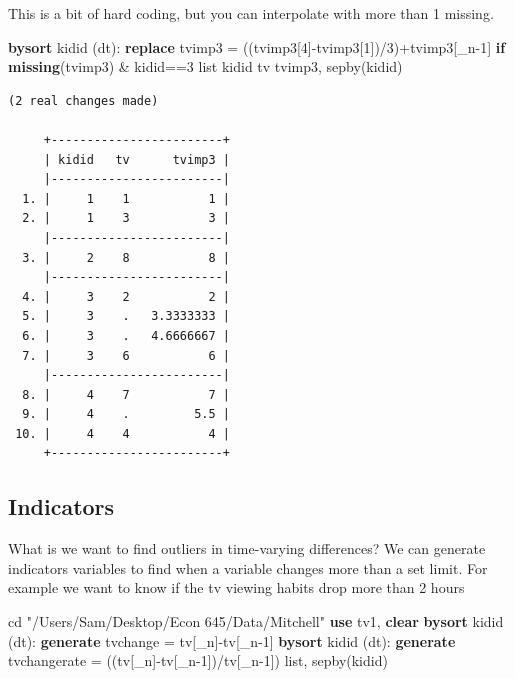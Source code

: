 \documentclass[
]{book}
\newenvironment{Shaded}{\begin{snugshade}}{\end{snugshade}}
\newcommand{\DataTypeTok}[1]{\textcolor[rgb]{0.13,0.29,0.53}{#1}}
\newcommand{\FunctionTok}[1]{\textcolor[rgb]{0.13,0.29,0.53}{\textbf{#1}}}
\newcommand{\KeywordTok}[1]{\textcolor[rgb]{0.13,0.29,0.53}{\textbf{#1}}}
\newcommand{\NormalTok}[1]{#1}
\newcommand{\OtherTok}[1]{\textcolor[rgb]{0.56,0.35,0.01}{#1}}
\newcommand{\StringTok}[1]{\textcolor[rgb]{0.31,0.60,0.02}{#1}}
\begin{document}
This is a bit of hard coding, but you can interpolate with more than 1 missing.

\begin{Shaded}
\begin{Highlighting}[]
\KeywordTok{bysort}\NormalTok{ kidid (dt): }\KeywordTok{replace}\NormalTok{ tvimp3 = ((tvimp3[4]{-}tvimp3[1])/3)+tvimp3[}\DataTypeTok{\_n}\NormalTok{{-}1] }\KeywordTok{if} \FunctionTok{missing}\NormalTok{(tvimp3) \& kidid==3}
\OtherTok{list}\NormalTok{ kidid tv tvimp3, sepby(kidid)}
\end{Highlighting}
\end{Shaded}

\begin{verbatim}
(2 real changes made)

     +------------------------+
     | kidid   tv      tvimp3 |
     |------------------------|
  1. |     1    1           1 |
  2. |     1    3           3 |
     |------------------------|
  3. |     2    8           8 |
     |------------------------|
  4. |     3    2           2 |
  5. |     3    .   3.3333333 |
  6. |     3    .   4.6666667 |
  7. |     3    6           6 |
     |------------------------|
  8. |     4    7           7 |
  9. |     4    .         5.5 |
 10. |     4    4           4 |
     +------------------------+
\end{verbatim}

\subsection*{Indicators}\label{indicators}

What is we want to find outliers in time-varying differences? We can generate
indicators variables to find when a variable changes more than a set limit.
For example we want to know if the tv viewing habits drop more than 2 hours

\begin{Shaded}
\begin{Highlighting}[]
\NormalTok{cd }\StringTok{"/Users/Sam/Desktop/Econ 645/Data/Mitchell"}
\KeywordTok{use}\NormalTok{ tv1, }\KeywordTok{clear}
\KeywordTok{bysort}\NormalTok{ kidid (dt): }\KeywordTok{generate}\NormalTok{ tvchange = tv[}\DataTypeTok{\_n}\NormalTok{]{-}tv[}\DataTypeTok{\_n}\NormalTok{{-}1]}
\KeywordTok{bysort}\NormalTok{ kidid (dt): }\KeywordTok{generate}\NormalTok{ tvchangerate = ((tv[}\DataTypeTok{\_n}\NormalTok{]{-}tv[}\DataTypeTok{\_n}\NormalTok{{-}1])/tv[}\DataTypeTok{\_n}\NormalTok{{-}1])}
\OtherTok{list}\NormalTok{, sepby(kidid)}
\end{Highlighting}
\end{Shaded}
\end{document}
